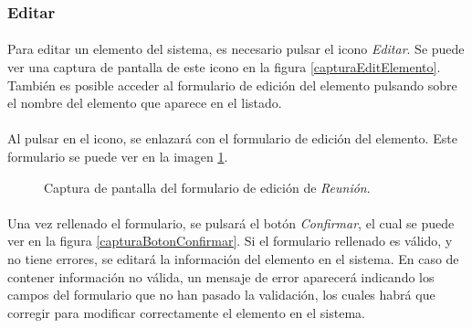 \subsubsection{Editar}

  \paragraph{}Para editar un elemento del sistema, es necesario pulsar el
  icono \textit{Editar}. Se puede ver una captura de pantalla de este
  icono en la figura \ref{capturaEditElemento}. También es posible acceder
  al formulario de edición del elemento pulsando sobre el nombre del elemento
  que aparece en el listado.

  \paragraph{}Al pulsar en el icono, se enlazará con el formulario de edición
  del elemento. Este formulario se puede ver en la imagen
  \ref{capturaEditReunion}.

  \begin{figure}[!ht]
    \begin{center}
      \caption{Captura de pantalla del formulario de edición de \textit{Reunión}.}
      \label{capturaEditReunion}
    \end{center}
  \end{figure}

  \paragraph{}Una vez rellenado el formulario, se pulsará el botón
  \textit{Confirmar}, el cual se puede ver en la figura
  \ref{capturaBotonConfirmar}. Si el formulario rellenado es válido, y no tiene
  errores, se editará la información del elemento en el sistema. En caso de
  contener información no válida, un mensaje de error aparecerá indicando los
  campos del formulario que no han pasado la validación, los cuales habrá que
  corregir para modificar correctamente el elemento en el sistema.
